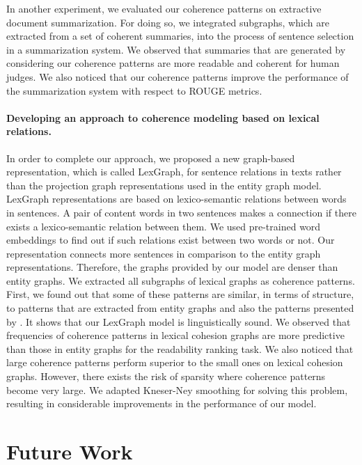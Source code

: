 In another experiment, we evaluated our coherence patterns on extractive document summarization. 
For doing so, we integrated subgraphs, which are extracted from a set of coherent summaries, into the process of sentence selection in a summarization system. 
We observed that summaries that are generated by considering our coherence patterns are more readable and coherent for human judges. 
We also noticed that our coherence patterns improve the performance of the summarization system with respect to ROUGE metrics. 

\paragraph{Developing an approach to coherence modeling based on lexical relations.} 
In order to complete our approach, we proposed a new graph-based representation, which is called \mbox{LexGraph}, for sentence relations in texts rather than the projection graph representations used in the entity graph model.   
LexGraph representations are based on lexico-semantic relations between words in sentences.
A pair of content words in two sentences makes a connection if there exists a lexico-semantic relation between them. 
We used pre-trained word embeddings to find out if such relations exist between two words or not.  
Our representation connects more sentences in comparison to the entity graph representations. 
Therefore, the graphs provided by our model are denser than entity graphs. 
We extracted all subgraphs of lexical graphs as coherence patterns. 
First, we found out that some of these patterns are similar, in terms of structure, to patterns that are extracted from entity graphs and also the patterns presented by .
It shows that our LexGraph model is linguistically sound. 
We observed that frequencies of coherence patterns in lexical cohesion graphs are more predictive than those in entity graphs for the readability ranking task. 
We also noticed that large coherence patterns perform superior to the small ones on lexical cohesion graphs.  
However, there exists the risk of sparsity where coherence patterns become very large. 
We adapted Kneser-Ney smoothing for solving this problem, resulting in considerable improvements in the performance of our model. 

\section{Future Work}
\label{sec:conc-future_work}

